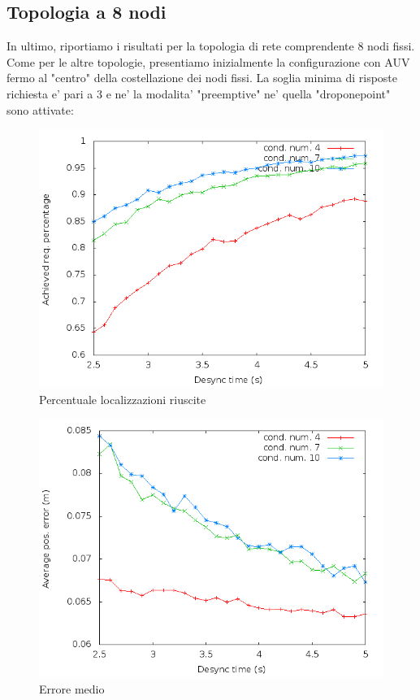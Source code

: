 \documentclass[Lau,binding=0.6cm]{sapthesis}
\begin{document}
\subsection{Topologia a 8 nodi}
In ultimo, riportiamo i risultati per la topologia di rete comprendente 8 nodi fissi. 
Come per le altre topologie, presentiamo inizialmente la configurazione con AUV fermo al "centro" della costellazione dei nodi fissi. La soglia minima di risposte richiesta e' pari a 3 e ne' la modalita' "preemptive" ne' quella "droponepoint" sono attivate:
\begin{figure}[H]
    \centering
    \includegraphics[scale=0.5]{octagonsimulation/achievedlocreq3preempt0drop0speed0.png}
    \caption{Percentuale localizzazioni riuscite}
    \label{fig:octagonsimulation/achievedlocreq3preempt0drop0speed0}
\end{figure}
\begin{figure}[H]
    \centering
    \includegraphics[scale=0.5]{octagonsimulation/avposerrorreq3preempt0drop0speed0.png}
    \caption{Errore medio}
    \label{fig:octagonsimulation/avposerrorreq3preempt0drop0speed0}
\end{figure}
\end{document}
